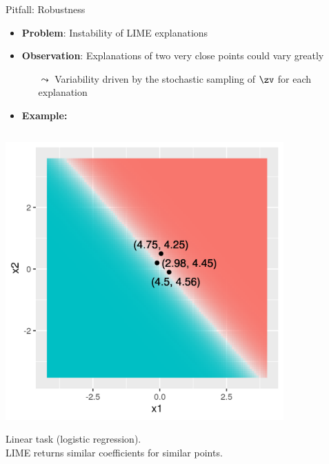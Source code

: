 \documentclass[11pt,compress,t,notes=noshow, aspectratio=169, xcolor=table]{beamer}
\begin{document}
\begin{frame}{Pitfall: Robustness }
\begin{itemize}
	\item \textbf{Problem}: Instability of LIME explanations 
	\item \textbf{Observation}: Explanations of two very close points could vary greatly 
	\begin{itemize}
	    \item[$\leadsto$] Variability driven by the stochastic sampling of $\zv$ for each explanation
	\end{itemize}
    \item \textbf{Example:}
\end{itemize}
\vspace{-0.7cm}
\begin{columns}[totalwidth=\textwidth]
	\begin{column}{0.5\textwidth}
		\begin{center}
		
		\includegraphics[width=0.8\textwidth]{figure/lime_robustness_1.png}
		
		{Linear task (logistic regression). \\
        LIME returns similar coefficients for similar points.}
		

\end{center}
\end{column}
\end{columns}
\end{frame}
\end{document}
